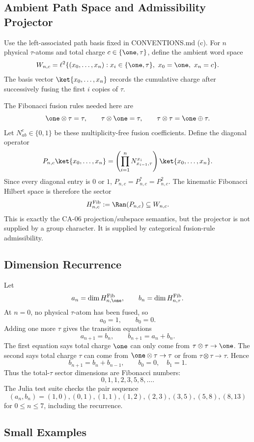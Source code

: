 \subsection{Ambient Path Space and Admissibility Projector}

Use the left-associated path basis fixed in CONVENTIONS.md (c).  For \(n\)
physical \(\tau\)-atoms and total charge \(c\in\{\one,\tau\}\), define the
ambient word space
\[
  W_{n,c}
  =
  \ell^2\{(x_0,\ldots,x_n):x_i\in\{\one,\tau\},\ x_0=\one,\ x_n=c\}.
\]
The basis vector \(\ket{x_0,\ldots,x_n}\) records the cumulative charge after
successively fusing the first \(i\) copies of \(\tau\).

The Fibonacci fusion rules needed here are
\[
  \one\otimes\tau=\tau,\qquad
  \tau\otimes\one=\tau,\qquad
  \tau\otimes\tau=\one\oplus\tau.
\]
Let \(N_{ab}^{c}\in\{0,1\}\) be these multiplicity-free fusion coefficients.
Define the diagonal operator
\[
  P_{n,c}\ket{x_0,\ldots,x_n}
  =
  \left(\prod_{i=1}^{n}N_{x_{i-1},\tau}^{x_i}\right)
  \ket{x_0,\ldots,x_n}.
\]
Since every diagonal entry is \(0\) or \(1\), \(P_{n,c}=P_{n,c}^*=P_{n,c}^2\).
The kinematic Fibonacci Hilbert space is therefore the sector
\[
  H^{\mathrm{Fib}}_{n,c}:=\Ran(P_{n,c})\subseteq W_{n,c}.
\]
This is exactly the CA-06 projection/subspace semantics, but the projector is
not supplied by a group character.  It is supplied by categorical fusion-rule
admissibility.

\subsection{Dimension Recurrence}

Let
\[
  a_n=\dim H^{\mathrm{Fib}}_{n,\one},\qquad
  b_n=\dim H^{\mathrm{Fib}}_{n,\tau}.
\]
At \(n=0\), no physical \(\tau\)-atom has been fused, so
\[
  a_0=1,\qquad b_0=0.
\]
Adding one more \(\tau\) gives the transition equations
\[
  a_{n+1}=b_n,\qquad b_{n+1}=a_n+b_n.
\]
The first equation says total charge \(\one\) can only come from
\(\tau\otimes\tau\to\one\).  The second says total charge \(\tau\) can come from
\(\one\otimes\tau\to\tau\) or from \(\tau\otimes\tau\to\tau\).  Hence
\[
  b_{n+1}=b_n+b_{n-1},\qquad b_0=0,\quad b_1=1.
\]
Thus the total-\(\tau\) sector dimensions are Fibonacci numbers:
\[
  0,1,1,2,3,5,8,\ldots .
\]
The Julia test suite checks the pair sequence
\[
  (a_n,b_n)=(1,0),(0,1),(1,1),(1,2),(2,3),(3,5),(5,8),(8,13)
\]
for \(0\le n\le7\), including the recurrence.

\subsection{Small Examples}

